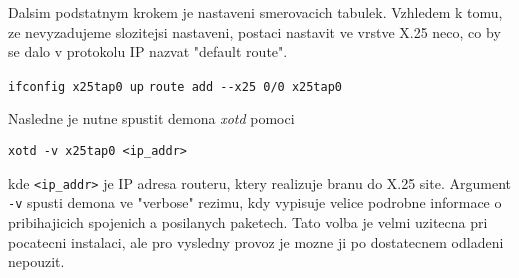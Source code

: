 \documentclass[a4paper,12pt]{article}
\begin{document}
Dalsim podstatnym krokem je nastaveni smerovacich tabulek. Vzhledem k tomu, ze
nevyzadujeme slozitejsi nastaveni, postaci nastavit ve vrstve X.25 neco, co by
se dalo v protokolu IP nazvat "default route".

\makebox[\textwidth]{}
\verb!ifconfig x25tap0 up! \linebreak
\verb!route add --x25 0/0 x25tap0! \linebreak
\makebox[\textwidth]{}

Nasledne je nutne spustit demona \emph{xotd} pomoci

\makebox[\textwidth]{}
\verb!xotd -v x25tap0 <ip_addr>! \linebreak
\makebox[\textwidth]{}

kde \verb!<ip_addr>! je IP adresa routeru,
ktery realizuje branu do X.25 site. Argument \verb!-v! spusti demona ve
"verbose" rezimu, kdy vypisuje velice podrobne informace o pribihajicich
spojenich a posilanych paketech. Tato volba je velmi uzitecna pri pocatecni
instalaci, ale pro vysledny provoz je mozne ji po dostatecnem odladeni nepouzit.
\end{document}
